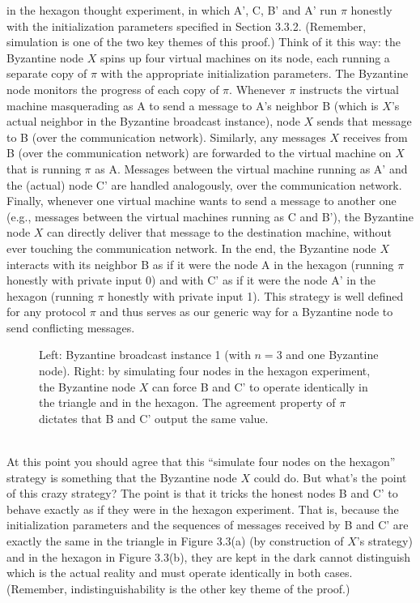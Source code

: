 in the hexagon thought experiment, in which A', C, B' and A' run $\pi$ honestly with the
initialization parameters specified in Section 3.3.2. (Remember, simulation is one of the two
key themes of this proof.) Think of it this way: the Byzantine node $X$ spins up four virtual
machines on its node, each running a separate copy of $\pi$ with the appropriate initialization
parameters. The Byzantine node monitors the progress of each copy of $\pi$. Whenever $\pi$ instructs the virtual machine masquerading as A to send a message to A’s neighbor B
(which is $X$’s actual neighbor in the Byzantine broadcast instance), node $X$ sends that
message to B (over the communication network). Similarly, any messages $X$ receives from
B (over the communication network) are forwarded to the virtual machine on $X$ that is
running $\pi$ as A. Messages between the virtual machine running as A' and the (actual)
node C' are handled analogously, over the communication network. Finally, whenever one
virtual machine wants to send a message to another one (e.g., messages between the virtual
machines running as C and B'), the Byzantine node $X$ can directly deliver that message
to the destination machine, without ever touching the communication network. In the end,
the Byzantine node $X$ interacts with its neighbor B as if it were the node A in the hexagon
(running $\pi$ honestly with private input 0) and with C' as if it were the node A'
in the hexagon (running $\pi$ honestly with private input 1). This strategy is well defined for any protocol $\pi$
and thus serves as our generic way for a Byzantine node to send conflicting messages.\\
\begin{figure}[h]
    \centering
    \qquad
    \caption{Left: Byzantine broadcast instance 1 (with $n = 3$ and one Byzantine node).
    Right: by simulating four nodes in the hexagon experiment, the Byzantine node $X$ can
    force B and C' to operate identically in the triangle and in the hexagon. The agreement
    property of $\pi$ dictates that B and C' output the same value.}
    \label{fig:example}%
\end{figure}\\

At this point you should agree that this “simulate four nodes on the hexagon” strategy is
something that the Byzantine node $X$ could do. But what’s the point of this crazy strategy?
The point is that it tricks the honest nodes B and C' to behave exactly as if they were in
the hexagon experiment. That is, because the initialization parameters and the sequences
of messages received by B and C' are exactly the same in the triangle in Figure 3.3(a) (by
construction of $X$’s strategy) and in the hexagon in Figure 3.3(b), they are kept in the dark
cannot distinguish which is the actual reality and must operate identically in both cases.
(Remember, indistinguishability is the other key theme of the proof.)

